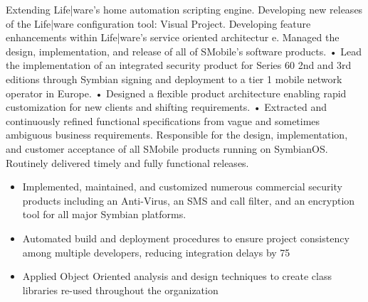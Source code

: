\documentclass{moderncv}
\begin{document}

Extending Life|ware's home automation scripting engine.
Developing new releases of the Life|ware configuration tool: Visual Project.
Developing feature enhancements within Life|ware's service oriented architectur
e.
{}{}
Managed the design, implementation, and release of all of SMobile’s software
products.
• Lead the implementation of an integrated security product for Series
60 2nd and 3rd editions through Symbian signing and deployment to a tier
1 mobile network operator in Europe.
• Designed a flexible product architecture enabling rapid customization
for new clients and shifting requirements.
• Extracted and continuously refined functional specifications from vague
and sometimes ambiguous business requirements.
Responsible for the design, implementation, and customer acceptance of all
SMobile products running on SymbianOS.
Routinely delivered timely and fully functional releases.
\begin{itemize}
    \item

        Implemented, maintained, and customized numerous commercial security products
        including an Anti-Virus, an SMS and call filter, and an encryption tool
        for all major Symbian platforms.
    \item
        Automated build and deployment procedures to ensure project consistency
        among multiple developers, reducing integration delays by 75%
    \item

        Applied Object Oriented analysis and design techniques to create class
        libraries re-used throughout the organization
\end{itemize}
\end{document}
